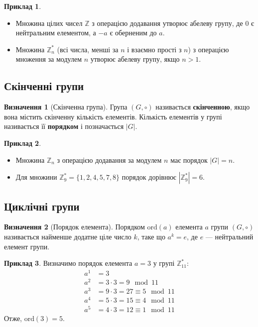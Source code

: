 \documentclass[12pt]{report}
\theoremstyle{definition}
\newtheorem{definition}{Визначення}[chapter]
\newtheorem{example}{Приклад}[chapter]
\theoremstyle{plain}
\begin{document}
\begin{example}
\begin{itemize}
    \item Множина цілих чисел \( \mathbb{Z} \) з операцією додавання утворює абелеву групу, де \( 0 \) є нейтральним елементом, а \( -a \) є оберненим до \( a \).
    \item Множина \( \mathbb{Z}^*_n \) (всі числа, менші за \( n \) і взаємно прості з \( n \)) з операцією множення за модулем \( n \) утворює абелеву групу, якщо \( n > 1 \).
\end{itemize}
\end{example}

\subsection{Скінченні групи}

\begin{definition}[Скінченна група]
Група \( (G, \circ) \) називається \textbf{скінченною}, якщо вона містить скінченну кількість елементів. Кількість елементів у групі називається її \textbf{порядком} і позначається \( |G| \).
\end{definition}

\begin{example}
\begin{itemize}
    \item Множина \( \mathbb{Z}_n \) з операцією додавання за модулем \( n \) має порядок \( |G| = n \).
    \item Для множини \( \mathbb{Z}^*_9 = \{1, 2, 4, 5, 7, 8\} \) порядок дорівнює \( |\mathbb{Z}^*_9| = 6 \).
\end{itemize}
\end{example}

\subsection{Циклічні групи}

\begin{definition}[Порядок елемента]
Порядком \( \text{ord}(a) \) елемента \( a \) групи \( (G, \circ) \) називається найменше додатне ціле число \( k \), таке що \( a^k = e \), де \( e \) — нейтральний елемент групи.
\end{definition}

\begin{example}
Визначимо порядок елемента \( a = 3 \) у групі \( \mathbb{Z}^*_{11} \):
\[
\begin{aligned}
a^1 & = 3 \\
a^2 & = 3 \cdot 3 = 9 \mod 11 \\
a^3 & = 9 \cdot 3 = 27 \equiv 5 \mod 11 \\
a^4 & = 5 \cdot 3 = 15 \equiv 4 \mod 11 \\
a^5 & = 4 \cdot 3 = 12 \equiv 1 \mod 11
\end{aligned}
\]
Отже, \( \text{ord}(3) = 5 \).
\end{example}
\end{document}
